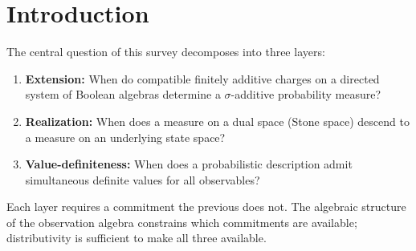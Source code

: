 \maketitle

\begin{abstract}
A thematic survey of the literature bearing on the question:
\emph{when does observationally coherent data determine a genuine
probability measure, and what additional commitments does this
require?}  The review is organized around four themes: (1)~the
boundary between finite additivity and $\sigma$-additivity,
(2)~Stone duality and the problem of realization,
(3)~value-definiteness and obstruction in non-distributive algebras,
and (4)~delay reconstruction as a source of observation algebras.
Within each theme, classical results are placed alongside the
philosophical, logical, and topos-theoretic perspectives that
illuminate the boundary.  Open problems and closed directions are
documented where they arise.  This is a working survey, not a
journal submission; it occasionally marks my own contributions and
dead ends alongside the literature.
\end{abstract}

\tableofcontents

\section{Introduction}
\label{sec:intro}

The central question of this survey decomposes into three layers:
\begin{enumerate}
  \item \textbf{Extension:} When do compatible finitely additive
    charges on a directed system of Boolean algebras determine a
    $\sigma$-additive probability measure?
  \item \textbf{Realization:} When does a measure on a dual space
    (Stone space) descend to a measure on an underlying state space?
  \item \textbf{Value-definiteness:} When does a probabilistic
    description admit simultaneous definite values for all
    observables?
\end{enumerate}
Each layer requires a commitment the previous does not.  The
algebraic structure of the observation algebra constrains which
commitments are available; distributivity is sufficient to make all
three available.

